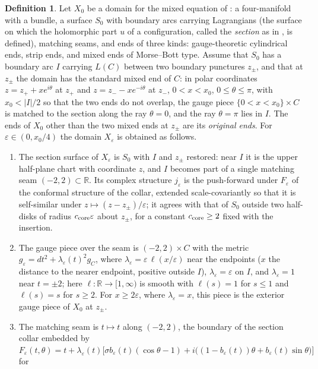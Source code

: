 \documentclass[11pt]{amsart}
\theoremstyle{definition}
\newtheorem{definition}[theorem]{Definition}
\theoremstyle{remark}
\theoremstyle{plain}
\numberwithin{equation}{section}
\newcommand{\RR}{\mathbb{R}}
\newcommand{\eps}{\varepsilon}
\begin{document}
\begin{definition}\label{def:insertion}
Let $X_0$ be a domain for the mixed equation of \cite{DFL}: a
four-manifold with a bundle, a surface $S_0$ with boundary arcs carrying
Lagrangians (the surface on which the holomorphic part $u$ of a configuration,
called the \emph{section} as in \cite{DFL}, is defined), matching seams, and ends of
three kinds: gauge-theoretic cylindrical ends, strip ends, and mixed ends of
Morse--Bott type. Assume that $S_0$ has a boundary arc $I$ carrying $L(C)$
between two boundary punctures $z_\pm$, and that at $z_\pm$ the domain has
the standard mixed end of $C$: in polar coordinates $z=z_++xe^{i\theta}$ at
$z_+$ and $z=z_--xe^{-i\theta}$ at $z_-$, $0<x<x_0$, $0\le\theta\le\pi$, with
$x_0<|I|/2$ so that the two ends do not overlap, the gauge piece $\{0<x<x_0\}\times C$ is
matched to the section along the ray $\theta=0$, and the ray $\theta=\pi$
lies in $I$. The ends of $X_0$ other than the two mixed ends at $z_\pm$ are its
\emph{original ends}. For $\eps\in(0,x_0/4)$ the domain $X_\eps$ is obtained as
follows.
\begin{enumerate}[label=(\roman*)]
\item The section surface of $X_\eps$ is $S_0$ with $I$ and $z_\pm$ restored:
  near $I$ it is the upper half-plane chart with coordinate $z$, and $I$
  becomes part of a single matching seam $(-2,2)\subset\RR$. Its complex
  structure $j_\eps$ is the push-forward under $F_\eps$ of the conformal
  structure of the collar, extended scale-covariantly so that it is
  self-similar under $z\mapsto(z-z_\pm)/\eps$; it agrees with that of $S_0$
  outside two half-disks of radius $c_{\rm core}\eps$ about $z_\pm$, for a constant
  $c_{\rm core}\ge2$ fixed with the insertion.
\item The gauge piece over the seam is $(-2,2)\times C$ with the metric
  $g_\eps=dt^2+\lambda_\eps(t)^2g_C$, where $\lambda_\eps=\eps\,\ell(x/\eps)$
  near the endpoints ($x$ the distance to the nearer endpoint, positive
  outside $I$), $\lambda_\eps=\eps$ on $I$, and $\lambda_\eps=1$ near
  $t=\pm2$; here $\ell\colon\RR\to[1,\infty)$ is smooth with $\ell(s)=1$ for
  $s\le1$ and $\ell(s)=s$ for $s\ge2$. For $x\ge2\eps$, where
  $\lambda_\eps=x$, this piece is the exterior gauge piece of $X_0$ at
  $z_\pm$.
\item The matching seam is $t\mapsto t$ along $(-2,2)$, the boundary of the
  section collar embedded by
  $F_\eps(t,\theta)=t+\lambda_\eps(t)\bigl[\sigma b_\eps(t)(\cos\theta-1)
  +i\bigl((1-b_\eps(t))\theta+b_\eps(t)\sin\theta\bigr)\bigr]$ for

\end{enumerate}
\end{definition}
\end{document}
